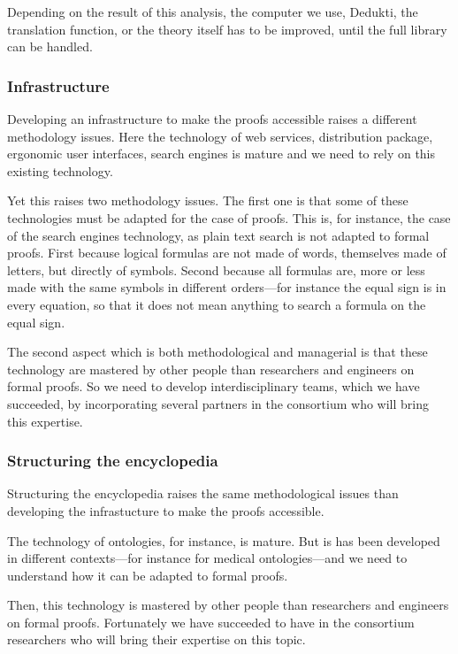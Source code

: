 Depending on the result of this analysis, the computer we use, Dedukti,
the translation function, or the theory itself has to be improved, until
the full library can be handled.

\subsubsection*{Infrastructure}

Developing an infrastructure to make the proofs accessible raises a
different methodology issues. Here the technology of web services,
distribution package, ergonomic user interfaces, search engines is
mature and we need to rely on this existing technology.

Yet this raises two methodology issues. The first one is that some of
these technologies must be adapted for the case of proofs. This is,
for instance, the case of the search engines technology, as plain text
search is not adapted to formal proofs. First because logical formulas
are not made of words, themselves made of letters, but directly of
symbols. Second because all formulas are, more or less made with the
same symbols in different orders---for instance the equal sign is in
every equation, so that it does not mean anything to search a formula
on the equal sign.

The second aspect which is both methodological and managerial is that
these technology are mastered by other people than researchers and
engineers on formal proofs. So we need to develop interdisciplinary
teams, which we have succeeded, by incorporating several partners
in the consortium who will bring this expertise.

\subsubsection*{Structuring the encyclopedia}

Structuring the encyclopedia raises the same methodological issues
than developing the infrastucture to make the proofs accessible.

The technology of ontologies, for instance, is mature. But is has been
developed in different contexts---for instance for medical
ontologies---and we need to understand how it can be adapted to formal
proofs. 

Then, this technology is mastered by other people than researchers and
engineers on formal proofs. Fortunately we have succeeded to have in
the consortium researchers who will bring their expertise on this
topic.

